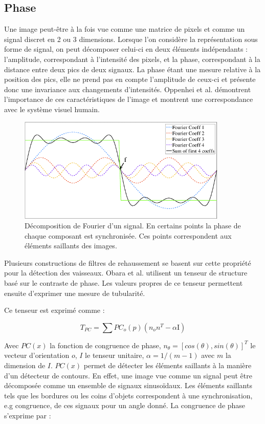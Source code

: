 \subsection{Phase}
\label{sec:EA:rehaussement:Phase}

Une image peut-être à la fois vue comme une matrice de pixels et comme un signal discret en 2 ou 3 dimensions. Lorsque l'on considère la représentation sous forme de signal, on peut décomposer celui-ci en deux éléments indépendants : l'amplitude, correspondant à l'intensité des pixels, et la phase, correspondant à la distance entre deux pics de deux signaux. La phase étant une mesure relative à la position des pics, elle ne prend pas en compte l'amplitude de ceux-ci et présente donc une invariance aux changements d'intensités. Oppenhei et al. \cite{Oppenheim1981_phase_importance} démontrent l'importance de ces caractéristiques de l'image et montrent une correspondance avec le système visuel humain. 

\begin{figure}[h]
  \centering
  \includegraphics[height=5cm]{Images/PC_decomposition.png}
  \caption{Décomposition de Fourier d'un signal. En certains points la phase de chaque composant est synchronisée. Ces points correspondent aux éléments saillants des images.}
  \label{fig:phase congruency}
\end{figure}

Plusieurs constructions de filtres de rehaussement se basent sur cette propriété pour la détection des vaisseaux. Obara et al. \cite{Obara2012_phase} utilisent un tenseur de structure basé sur le contraste de phase. Les valeurs propres de ce tenseur permettent ensuite d'exprimer une mesure de tubularité.

Ce tenseur est exprimé comme :

\begin{equation}
  T_{PC} = \sum PC_{o}(p)(n_{o}n^T - \alpha \text{I})
\end{equation}

Avec $PC(x)$ la fonction de congruence de phase, $n_{\theta}=[cos(\theta),sin(\theta)]^T$ le vecteur d'orientation $o$, $I$ le tenseur unitaire, $\alpha = 1/(m-1)$ avec $m$ la dimension de $I$. $PC(x)$ permet de détecter les éléments saillants à la manière d'un détecteur de contours.
En effet, une image vue comme un signal peut être décomposée comme un ensemble de signaux sinusoïdaux. Les éléments saillants tels que les bordures ou les coins d'objets correspondent à une synchronisation, e.g congruence, de ces signaux pour un angle donné. La congruence de phase s'exprime par :

